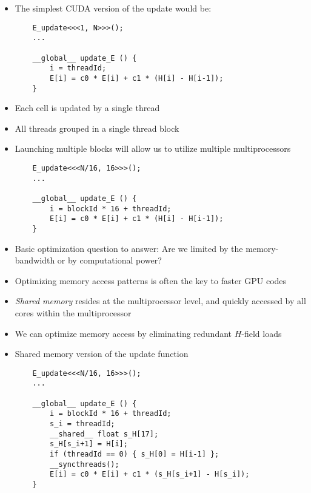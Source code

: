\documentclass[landscape]{foils}
\newcommand{\oursection}[1]{
\foilhead[-1.0cm]{#1}
}
\newcommand{\I}{\item}
\newcommand{\EI}{\end{itemize}}
\begin{document}
\begin{itemize}
\newpage
\I  The simplest CUDA version of the update would be:
    \begin{verbatim}
    E_update<<<1, N>>>();
    ...
    
    __global__ update_E () {
        i = threadId;
        E[i] = c0 * E[i] + c1 * (H[i] - H[i-1]); 
    }
    \end{verbatim}
\I  Each cell is updated by a single thread
\I  All threads grouped in a single thread block

\newpage
\I  Launching multiple blocks will allow us to utilize
        multiple multiprocessors
    \begin{verbatim}
    E_update<<<N/16, 16>>>();
    ...

    __global__ update_E () {
        i = blockId * 16 + threadId;
        E[i] = c0 * E[i] + c1 * (H[i] - H[i-1]); 
    }
    \end{verbatim}

\oursection{Optimizing FDTD on the GPU}
\I  Basic optimization question to answer:
    Are we limited by the memory-bandwidth or by computational power?
\I  Optimizing memory access patterns is often the key to faster GPU codes
\I  \emph{Shared memory} resides at the multiprocessor level,
        and quickly accessed by all cores within the multiprocessor
\I  We can optimize memory access by eliminating redundant $H$-field loads

\newpage
\I  Shared memory version of the update function
    \begin{verbatim}
    E_update<<<N/16, 16>>>();
    ...

    __global__ update_E () {
        i = blockId * 16 + threadId;
        s_i = threadId;
        __shared__ float s_H[17];
        s_H[s_i+1] = H[i];
        if (threadId == 0) { s_H[0] = H[i-1] };
        __syncthreads();
        E[i] = c0 * E[i] + c1 * (s_H[s_i+1] - H[s_i]); 
    }
    \end{verbatim}



\EI
\end{document}
